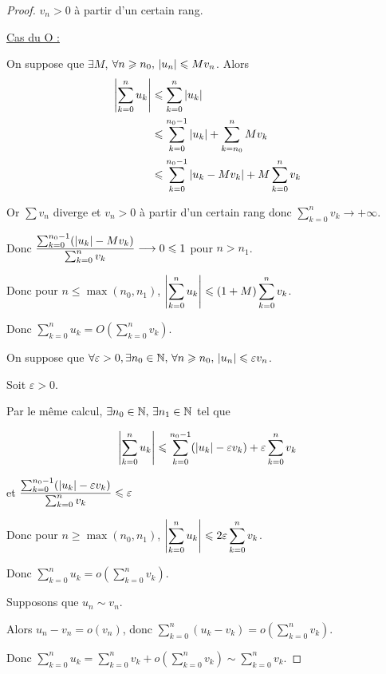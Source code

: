 \begin{proof} $v_n > 0$ à partir d'un certain rang.
    
    \uline{Cas du O : }

    \svspace On suppose que $\exists M$, $\forall n \geqslant n_0, \, \left|u_n\right| \leqslant M v_n$.
    Alors \begin{align*}
        \left|\sum_{k = 0 }^{n } u_k\right| & \leqslant \sum_{k=0 }^{n } \left|u_k\right| \\
                                    & \leqslant \sum_{k = 0}^{n_0 - 1} \left|u_k\right| + \sum_{k = n_0}^{n } M v_k \\
                                    & \leqslant \sum_{k = 0}^{n_0 - 1} \left|u_k - M v_k\right| + M \sum_{k = 0}^{n } v_k \\
    \end{align*} 

    Or $\sum v_n$ diverge et $v_n > 0$ à partir d'un certain rang donc $\sum_{k = 0}^{n } v_k \longrightarrow + \infty$.

    \svspace Donc $\displaystyle \frac{\sum_{k = 0 }^{n_0 - 1} (\left|u_k\right| - M v_k)}{ \sum_{k = 0}^n v_k} \longrightarrow 0 \leqslant 1$ pour $n > n_1$.

    \svspace Donc pour $\displaystyle n \leqslant \max(n_0, n_1)$, $\displaystyle \left|\sum_{k = 0 }^{n } u_k\right| \leqslant \left( 1 + M \right) \sum_{k = 0}^{n } v_k$.

    Donc $\displaystyle \sum_{k = 0}^{n } u_k = O\left( \sum_{k = 0}^{n } v_k \right)$.


    \svspace On suppose que $\forall \varepsilon > 0, \exists n_0 \in \mathbb{N}, \, \forall n \geqslant n_0, \, \left|u_n\right| \leqslant \varepsilon v_n$.

    Soit $\varepsilon > 0$. 

    Par le même calcul, $\exists n_0 \in \mathbb{N}, \, \exists n_1 \in \mathbb{N}$ tel que 

    $$\left|\sum_{k = 0 }^{n } u_k\right| \leqslant \sum_{k = 0}^{n_0 - 1} (\left|u_k\right| - \varepsilon v_k) + \varepsilon \sum_{k = 0}^{n } v_k$$

    et $\displaystyle \frac{\sum_{k = 0 }^{n_0 - 1} (\left|u_k\right| - \varepsilon v_k)}{\sum_{k = 0}^{n } v_k} \leqslant \varepsilon$ 

    \svspace Donc pour $n \geqslant \max(n_0, n_1)$, $\displaystyle \left|\sum_{k = 0 }^{n } u_k\right| \leqslant 2 \varepsilon \sum_{k = 0}^{n } v_k$.

    Donc $\displaystyle \sum_{k = 0}^{n } u_k = o\left( \sum_{k = 0}^{n } v_k \right)$.


    \svspace Supposons que $u_n \sim v_n$.

    Alors $\displaystyle u_n - v_n = o(v_n)$, donc $\displaystyle \sum_{k = 0}^{n } (u_k - v_k) = o\left( \sum_{k = 0}^{n } v_k \right)$.

    Donc $\displaystyle \sum_{k = 0}^{n } u_k = \sum_{k = 0}^{n } v_k + o\left( \sum_{k = 0}^{n } v_k \right) \sim \sum_{k = 0}^{n } v_k$.
\end{proof} 

